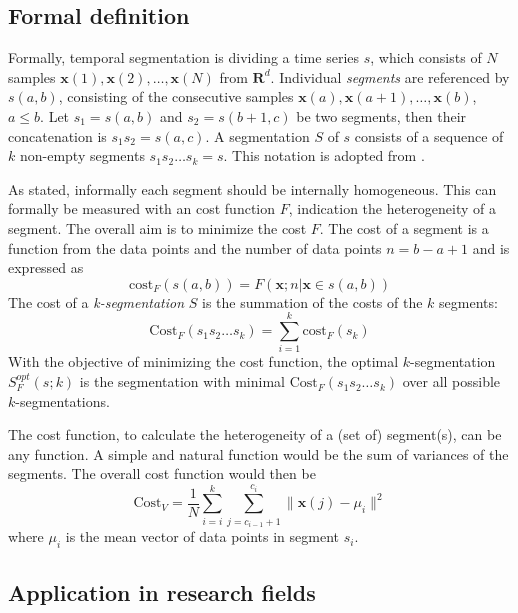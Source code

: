 \subsection{Formal definition}
Formally, temporal segmentation is dividing a time series $s$, which consists of $N$ samples $\mathbf{x}(1),\mathbf{x}(2),\dots,\mathbf{x}(N)$ from $\mathbf{R}^d$.
Individual \emph{segments} are referenced by $s(a,b)$, consisting of the consecutive samples $\mathbf{x}(a),\mathbf{x}(a+1),\dots,\mathbf{x}(b)$, $a \le b$.
Let $s_1 = s(a,b)$ and $s_2 = s(b+1,c)$ be two segments, then their concatenation is $s_1s_2 = s(a,c)$.
A segmentation $S$ of $s$ consists of a sequence of $k$ non-empty segments $s_1s_2 \dots s_k = s$.
This notation is adopted from \cite{himberg2001time}.

As stated, informally each segment should be internally homogeneous.
This can formally be measured with an cost function $F$, indication the heterogeneity of a segment.
The overall aim is to minimize the cost $F$. The cost of a segment is a function from the data points and the number of data points
$n = b - a + 1$ and is expressed as
\begin{equation}
	\label{eq:segment_cost}
	\mathrm{cost}_F (s(a,b)) = F(\mathbf{x};n|\mathbf{x} \in s(a,b))
\end{equation}
The cost of a \emph{k-segmentation} $S$ is the summation of the costs of the $k$ segments:
\begin{equation}
	\label{eq:segmentation_cost}
	\mathrm{Cost}_F (s_1 s_2 \dots s_k) = \sum_{i=1}^{k} \mathrm{cost}_F (s_k)
\end{equation}
With the objective of minimizing the cost function, the optimal $k$-segmentation $S_F^\mathit{opt}(s;k)$ is the segmentation with minimal $\mathrm{Cost}_F(s_1 s_2 \dots s_k)$ over all possible $k$-segmentations.

The cost function, to calculate the heterogeneity of a (set of) segment(s), can be any function.
A simple and natural function would be the sum of variances of the segments.
The overall cost function would then be
\begin{equation}
	\label{eq:cost_variances}
	\mathrm{Cost}_V = \frac{1}{N} \sum_{i=i}^{k} \sum_{j=c_{i-1}+1}^{c_i} \|
	\mathbf{x}(j) - \mu_i \|^2
\end{equation}
where $\mu_i$ is the mean vector of data points in segment $s_i$.

\subsection{Application in research fields}

